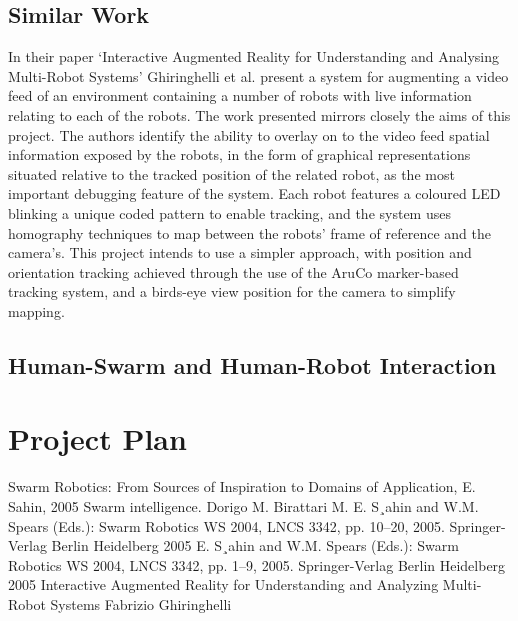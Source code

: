 \documentclass[titlepage,hidelinks,10pt]{article}
\begin{document}
\begin{multicols*}{2}
\subsection{Similar Work} \label{SimilarWork}
In their paper `Interactive Augmented Reality for Understanding and Analysing Multi-Robot Systems' Ghiringhelli et al. present a system for augmenting a video feed of an environment containing a number of robots with live information relating to each of the robots\cite{LEDSwarmAR}. The work presented mirrors closely the aims of this project. The authors identify the ability to overlay on to the video feed spatial information exposed by the robots, in the form of graphical representations situated relative to the tracked position of the related robot, as the most important debugging feature of the system. Each robot features a coloured LED blinking a unique coded pattern to enable tracking, and the system uses homography techniques to map between the robots' frame of reference and the camera's. This project intends to use a simpler approach, with position and orientation tracking achieved through the use of the AruCo marker-based tracking system, and a birds-eye view position for the camera to simplify mapping.

\subsection{Human-Swarm and Human-Robot Interaction} \label{HumanSwarmInteraction}


\section{Project Plan}
\begin{thebibliography}{1}
 Swarm Robotics: From Sources of
Inspiration to Domains of Application, E. Sahin, 2005
 Swarm intelligence. Dorigo M. Birattari M.
 E. S¸ahin and W.M. Spears (Eds.): Swarm Robotics WS 2004, LNCS 3342, pp. 10–20, 2005. Springer-Verlag Berlin Heidelberg 2005
 E. S¸ahin and W.M. Spears (Eds.): Swarm Robotics WS 2004, LNCS 3342, pp. 1–9, 2005. Springer-Verlag Berlin Heidelberg 2005
 Interactive Augmented Reality for Understanding and Analyzing Multi-Robot Systems Fabrizio Ghiringhelli
\end{thebibliography}

\end{multicols*}
\end{document}
